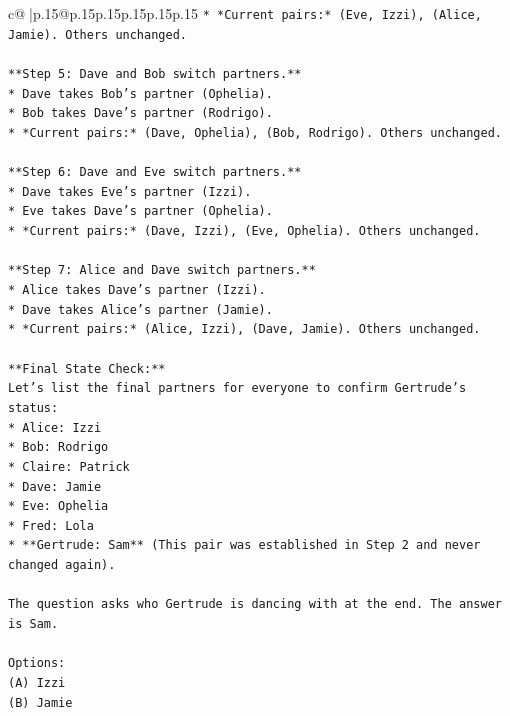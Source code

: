 \documentclass{article}
\begin{document}
{\begin{supertabular}{c@{$\;$}|p{.15\linewidth}@{}p{.15\linewidth}p{.15\linewidth}p{.15\linewidth}p{.15\linewidth}p{.15\linewidth}}
{{{\texttt{*   *Current pairs:* (Eve, Izzi), (Alice, Jamie). Others unchanged.} \\
\\ 
\texttt{**Step 5: Dave and Bob switch partners.**} \\
\texttt{*   Dave takes Bob's partner (Ophelia).} \\
\texttt{*   Bob takes Dave's partner (Rodrigo).} \\
\texttt{*   *Current pairs:* (Dave, Ophelia), (Bob, Rodrigo). Others unchanged.} \\
\\ 
\texttt{**Step 6: Dave and Eve switch partners.**} \\
\texttt{*   Dave takes Eve's partner (Izzi).} \\
\texttt{*   Eve takes Dave's partner (Ophelia).} \\
\texttt{*   *Current pairs:* (Dave, Izzi), (Eve, Ophelia). Others unchanged.} \\
\\ 
\texttt{**Step 7: Alice and Dave switch partners.**} \\
\texttt{*   Alice takes Dave's partner (Izzi).} \\
\texttt{*   Dave takes Alice's partner (Jamie).} \\
\texttt{*   *Current pairs:* (Alice, Izzi), (Dave, Jamie). Others unchanged.} \\
\\ 
\texttt{**Final State Check:**} \\
\texttt{Let's list the final partners for everyone to confirm Gertrude's status:} \\
\texttt{*   Alice: Izzi} \\
\texttt{*   Bob: Rodrigo} \\
\texttt{*   Claire: Patrick} \\
\texttt{*   Dave: Jamie} \\
\texttt{*   Eve: Ophelia} \\
\texttt{*   Fred: Lola} \\
\texttt{*   **Gertrude: Sam** (This pair was established in Step 2 and never changed again).} \\
\\ 
\texttt{The question asks who Gertrude is dancing with at the end. The answer is Sam.} \\
\\ 
\texttt{Options:} \\
\texttt{(A) Izzi} \\
\texttt{(B) Jamie} \\
}}}
\end{supertabular}}
\end{document}
